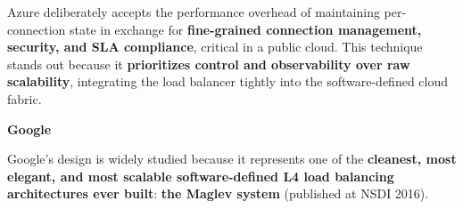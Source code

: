 Azure deliberately accepts the performance overhead of maintaining per-\break connection state in exchange for \textbf{fine-grained connection management, security, and SLA compliance}, critical in a public cloud. This technique stands out because it \textbf{prioritizes control and observability over raw scalability}, integrating the load balancer tightly into the software-defined cloud fabric.

\newpage

\begin{flushleft}
    \textcolor{Green3}{ \textbf{Google}}
\end{flushleft}
Google's design is widely studied because it represents one of the \textbf{cleanest, most elegant, and most scalable software-defined L4 load balancing architectures ever built}: \textbf{the Maglev system} (published at NSDI 2016)\cite{eisenbud2016maglev}.

